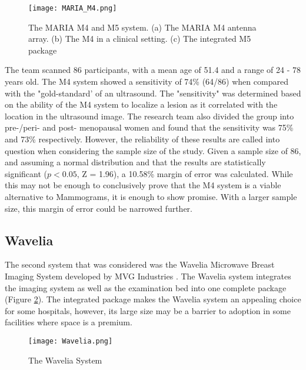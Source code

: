 \begin{figure}
    \texttt{[image: MARIA\_M4.png]}
    \centering
    \caption{The MARIA M4 and M5 system. (a) The MARIA M4 antenna array. (b) The M4 in a clinical setting. (c) The integrated M5 package \cite{preeceMARIAM4Clinical2016}}
    \label{fig:MARIAM4}
\end{figure}

\noindent The team scanned 86 participants, with a mean age of 51.4 and a range of 24 - 78 years old. The M4 system showed a sensitivity of
74\% (64/86) when compared with the "gold-standard' of an ultrasound. The "sensitivity" was determined based on the
ability of the M4 system to localize a lesion as it correlated with the location in the ultrasound image. The research
team also divided the group into pre-/peri- and post- menopausal women and found that the sensitivity was 75\% and 73\%
respectively. However, the reliability of these results are called into question when considering the sample size of the
study. Given a sample size of 86, and assuming a normal distribution and that the results are statistically significant
($p < 0.05$, Z = 1.96), a 10.58\% margin of error was calculated. While this may not be enough to conclusively prove
that the M4 system is a viable alternative to Mammograms, it is enough to show promise. With a larger sample size, this
margin of error could be narrowed further.

\subsection{Wavelia}
The second system that was considered was the Wavelia Microwave Breast Imaging System developed by MVG Industries
\cite{moloneyWaveliaMicrowaveBreast2021}. The Wavelia system integrates the imaging system as well as the examination
bed into one complete package (Figure \ref{fig:WaveliaSystem}). The integrated package makes the Wavelia system an
appealing choice for some hospitals, however, its large size may be a barrier to adoption in some facilities where space
is a premium. \hfill \break

\begin{figure}
    \texttt{[image: Wavelia.png]}
    \centering
    \caption{The Wavelia System \cite{moloneyWaveliaMicrowaveBreast2021}}
    \label{fig:WaveliaSystem}
\end{figure}

